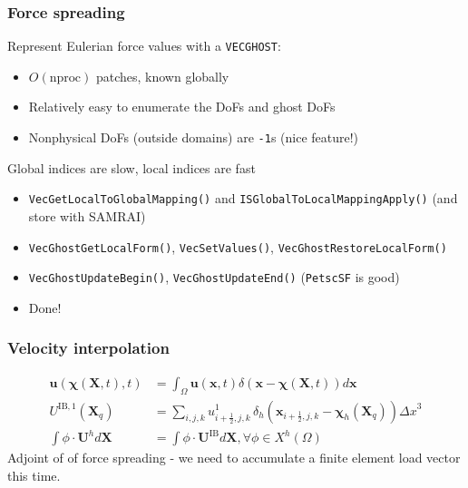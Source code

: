 \documentclass[8pt]{beamer}
\newcommand{\euleriandx}{{\ensuremath{\Delta x}}}
\newcommand{\half}{{\ensuremath{\frac{1}{2}}}}
\newcommand{\Chib}{\boldsymbol{\chi}}
\newcommand{\xface}{{i + \half, j, k}}
\newcommand{\xb}{\boldsymbol{x}}
\newcommand{\Xb}{\boldsymbol{X}}
\begin{document}
\begin{frame}
    \frametitle{Force spreading}
    \vfill
    Represent Eulerian force values with a \texttt{VECGHOST}:
    \begin{itemize}
      \item[$\blacksquare$] $O(\mathrm{nproc})$ patches, known globally
      \item[$\blacksquare$] Relatively easy to enumerate the DoFs and ghost DoFs
      \item[$\blacksquare$] Nonphysical DoFs (outside domains) are \texttt{-1}s
        (nice feature!)
    \end{itemize}
    \vfill
    Global indices are slow, local indices are fast
    \begin{itemize}
      \item[$\blacksquare$] \texttt{VecGetLocalToGlobalMapping()} and \texttt{ISGlobalToLocalMappingApply()} (and store with SAMRAI)
      \item[$\blacksquare$] \texttt{VecGhostGetLocalForm()}, \texttt{VecSetValues()}, \texttt{VecGhostRestoreLocalForm()}
      \item[$\blacksquare$] \texttt{VecGhostUpdateBegin()}, \texttt{VecGhostUpdateEnd()} (\texttt{PetscSF} is good)
      \item[$\blacksquare$] Done!
    \end{itemize}
    \vfill
\end{frame}

\begin{frame}
    \frametitle{Velocity interpolation}
    \vfill
    \begin{align*}
        \mathbf{u}(\Chib(\Xb, t), t)
        &= \int_\Omega \mathbf{u}(\xb, t)
        \delta (\xb - \Chib(\Xb, t)) d\xb                \\
        U^{\text{IB},1}(\Xb_q) &= \sum_{i,j,k} u^1_{\xface}
        \, \delta_h(\xb_{\xface} - \Chib_h(\Xb_q)) \euleriandx^3 \\
        \int \phi \cdot \mathbf{U}^h d\Xb
        &= \int \phi \cdot \mathbf{U}^{\text{IB}} d\Xb, \forall \phi \in X^h(\Omega)
    \end{align*}
    \vfill
    Adjoint of of force spreading - we need to accumulate a finite element load vector this time.
    \vfill
\end{frame}
\end{document}
